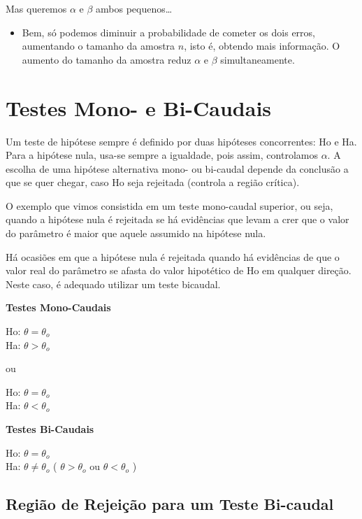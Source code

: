 \documentclass[
]{book}
\providecommand{\tightlist}{%
  \setlength{\itemsep}{0pt}\setlength{\parskip}{0pt}}
\theoremstyle{definition}
\theoremstyle{definition}
\theoremstyle{definition}
\theoremstyle{remark}
\begin{document}
Mas queremos \(\alpha\) e \(\beta\) ambos pequenos\ldots{}

\begin{itemize}
\tightlist
\item
  Bem, só podemos diminuir a probabilidade de cometer os dois erros, aumentando o tamanho da amostra \(n\), isto é, obtendo mais informação. O aumento do tamanho da amostra reduz \(\alpha\) e \(\beta\) simultaneamente.
\end{itemize}

\hypertarget{testes-mono--e-bi-caudais}{%
\section{Testes Mono- e Bi-Caudais}\label{testes-mono--e-bi-caudais}}

Um teste de hipótese sempre é definido por duas hipóteses concorrentes: Ho e Ha. Para a hipótese nula, usa-se sempre a igualdade, pois assim, controlamos \(\alpha\). A escolha de uma hipótese alternativa mono- ou bi-caudal depende da conclusão a que se quer chegar, caso Ho seja rejeitada (controla a região crítica).

O exemplo que vimos consistida em um teste mono-caudal superior, ou seja, quando a hipótese nula é rejeitada se há evidências que levam a crer que o valor do parâmetro é maior que aquele assumido na hipótese nula.

Há ocasiões em que a hipótese nula é rejeitada quando há evidências de que o valor real do parâmetro se afasta do valor hipotético de Ho em qualquer direção. Neste caso, é adequado utilizar um teste bicaudal.

\textbf{Testes Mono-Caudais}

Ho: \(\theta = \theta_o\)\\
Ha: \(\theta > \theta_o\)

ou

Ho: \(\theta = \theta_o\)\\
Ha: \(\theta < \theta_o\)

\textbf{Testes Bi-Caudais}

Ho: \(\theta = \theta_o\)\\
Ha: \(\theta \neq \theta_o\) ( \(\theta > \theta_o\) ou \(\theta < \theta_o\) )\\

\hypertarget{regiuxe3o-de-rejeiuxe7uxe3o-para-um-teste-bi-caudal}{%
\subsection*{Região de Rejeição para um Teste Bi-caudal}\label{regiuxe3o-de-rejeiuxe7uxe3o-para-um-teste-bi-caudal}}
\end{document}
